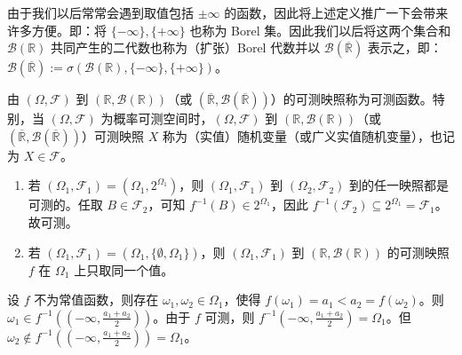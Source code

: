 \documentclass[lang=cn,10pt,thmcnt=section]{elegantbook}
\begin{document}
由于我们以后常常会遇到取值包括 \(\pm \infty\) 的函数，因此将上述定义推广一下会带来许多方便。即：将 \(\{-\infty\}, \{+\infty\}\) 也称为 Borel 集。因此我们以后将这两个集合和 \(\mathcal{B}(\mathbb{R})\) 共同产生的二代数也称为（扩张）Borel 代数并以 \(\mathcal{B}(\overline{\mathbb{R}})\) 表示之，即：\(\mathcal{B}(\overline{\mathbb{R}}) := \sigma(\mathcal{B}(\mathbb{R}), \{-\infty\}, \{+\infty\})\)。

\begin{definition}
	由 \((\Omega, \mathscr{F})\) 到 \((\mathbb{R}, \mathcal{B}(\mathbb{R}))\)（或 \((\overline{\mathbb{R}}, \mathcal{B}(\overline{\mathbb{R}}))\)）的可测映照称为可测函数。特别，当 \((\Omega, \mathscr{F})\) 为概率可测空间时，\((\Omega, \mathscr{F})\) 到 \((\mathbb{R}, \mathcal{B}(\mathbb{R}))\)（或 \((\overline{\mathbb{R}}, \mathcal{B}(\overline{\mathbb{R}}))\)）可测映照 \(X\) 称为（实值）随机变量（或广义实值随机变量），也记为 \(X \in \mathscr{F}\)。
\end{definition}

\begin{example}
	\begin{enumerate}
		\item 若 \((\Omega_1, \mathscr{F}_1) = (\Omega_1, 2^{\Omega_1})\)，则 \((\Omega_1, \mathscr{F}_1)\) 到 \((\Omega_2, \mathscr{F}_2)\) 到的任一映照都是可测的。任取 \(B \in \mathscr{F}_2\)，可知 \(f^{-1}(B) \in 2^{\Omega_1}\)，因此 \(f^{-1}(\mathscr{F}_2) \subseteq 2^{\Omega_1} = \mathscr{F}_1\)。故可测。	
	\item 若 \((\Omega_1, \mathscr{F}_1) = (\Omega_1, \{\emptyset, \Omega_1\})\)，则 \((\Omega_1, \mathscr{F}_1)\) 到 \((\mathbb{R}, \mathcal{B}(\mathbb{R}))\) 的可测映照 \(f\) 在 \(\Omega_1\) 上只取同一个值。
\end{enumerate}
\end{example}
设 \(f\) 不为常值函数，则存在 \(\omega_1, \omega_2 \in \Omega_1\)，使得 \(f(\omega_1) = a_1 < a_2 = f(\omega_2)\)。则 \(\omega_1 \in f^{-1}((-\infty, \frac{a_1 + a_2}{2}))\)。由于 \(f\) 可测，则 \(f^{-1}(-\infty, \frac{a_1 + a_2}{2}) = \Omega_1\)。但 \(\omega_2 \notin f^{-1}((-\infty, \frac{a_1 + a_2}{2})) = \Omega_1\)。
\end{document}

